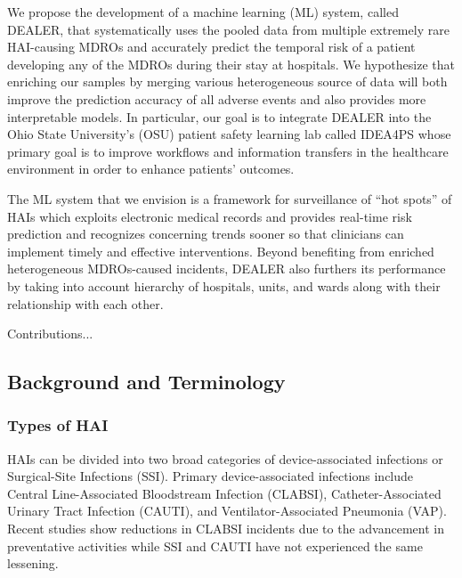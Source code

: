

We propose the development of a machine learning (ML) system, called DEALER, that systematically uses the pooled data from multiple extremely rare HAI-causing MDROs and accurately predict the temporal risk of a patient developing any of the MDROs during their stay at hospitals. We hypothesize that enriching our samples by merging various heterogeneous source of data will both improve the prediction accuracy of all adverse events and also provides more interpretable models. In particular, our goal is to integrate DEALER into the Ohio State University's (OSU) patient safety learning lab called IDEA4PS whose primary goal is to improve workflows and information transfers in the healthcare environment in order to enhance patients' outcomes.  

The ML system that we envision is a framework for surveillance of ``hot spots'' of HAIs which exploits electronic medical records and provides real-time risk prediction and recognizes concerning trends sooner so that clinicians can implement timely and effective interventions. Beyond benefiting from enriched heterogeneous MDROs-caused incidents, DEALER also furthers its performance by taking into account hierarchy of hospitals, units, and wards along with their relationship with each other.
 

Contributions...







\subsection{Background and Terminology}
\subsubsection{Types of HAI}
HAIs can be divided into two broad categories of device-associated infections or Surgical-Site Infections (SSI). Primary device-associated infections include Central Line-Associated Bloodstream Infection (CLABSI), Catheter-Associated Urinary Tract Infection (CAUTI), and Ventilator-Associated Pneumonia (VAP). Recent studies show reductions in CLABSI incidents due to the advancement in preventative activities while SSI and CAUTI have not experienced the same lessening. 

